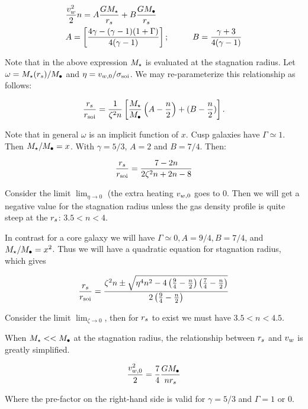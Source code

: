\begin{align}
&\frac{v_w^2}{2} n =A \frac{G M_{\star}}{r_s} +B \frac{G M_{\bullet}}{r_s}\\
&A=\left[\frac{4\gamma-(\gamma-1)(1+\Gamma)}{4(\gamma-1)}\right]; \hspace{1cm} B=\frac{\gamma+3}{4(\gamma-1)}
\end{align}

Note that in the above expression $M_{\star}$ is evaluated at the stagnation radius. Let $\omega=M_{\star}(r_s)/M_{\bullet}$ and 
$\eta=v_{w,0}/\sigma_{\rm soi}$. We may re-parameterize this relationship as follows:

\begin{align}
  \frac{r_s}{r_{\rm soi}}=\frac{1}{\zeta^2 n}\left[
   \frac{M_{\star}}{M_{\bullet}}\left(A-\frac{n}{2}\right)+(B-\frac{n}{2})\right].
\end{align}

Note that in general $\omega$ is an implicit function of $x$. Cusp galaxies have $\Gamma\simeq1$.  Then $M_{\star}/M_{\bullet}=x$. With $\gamma=5/3$, $A=2$ and $B=7/4$.  Then:

\begin{align}
\frac{r_s}{r_{\rm soi}}=\frac{7-2n}{2\zeta^2 n+2n-8}
\end{align}

Consider the limit $\lim_{\eta \to 0}$ (the extra heating $v_{w,0}$ goes to 0. Then we will get a negative value for the stagnation radius unless the gas density profile is quite steep at the $r_s$: $3.5<n<4$.

In contrast for a core galaxy we will have $\Gamma\simeq0, A=9/4,
B=7/4$, and $M_{\star}/M_{\bullet}=x^2$. Thus we will have a quadratic equation for
stagnation radius, which gives

\begin{align}
\frac{r_s}{r_{\rm soi}}=\frac{\zeta^2 n \pm \sqrt{\eta^4 n^2 -4 \left(\frac{9}{4}-\frac{n}{2}\right) \left(\frac{7}{4}-\frac{n}{2}\right)}}{2\left(\frac{9}{4}-\frac{n}{2}\right)}
\label{eq:rstag}
\end{align}

Consider the limit $\lim_{\zeta \to 0}$, then for $r_s$ to exist we must have $3.5<n<4.5$.

When $M_{\star} << M_{\bullet}$ at the stagnation radius, the relationship between $r_s$ and $v_w$ is greatly simplified. 

\begin{align}
\frac{v_{w,0}^2}{2}=\frac{7}{4}\frac{G M_{\bullet}}{n r_s}
\end{align}

Where the pre-factor on the right-hand side is valid for $\gamma=5/3$ and $\Gamma=1$ or 0.  


